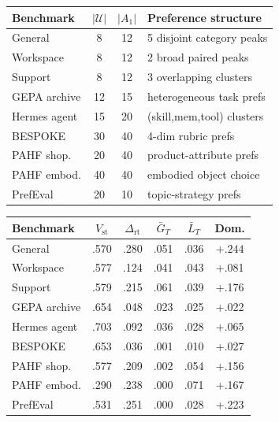 \documentclass{article} %
\begin{document}
\begin{table}[t]
\centering
\small
\begin{minipage}{0.48\textwidth}
\centering
\begin{tabular}{lccl}
\toprule
\textbf{Benchmark} & $|\mathcal{U}|$ & $|A_1|$ & Preference structure \\
\midrule
General       &  8 & 12 & 5 disjoint category peaks \\
Workspace     &  8 & 12 & 2 broad paired peaks \\
Support       &  8 & 12 & 3 overlapping clusters \\
GEPA archive  & 12 & 15 & heterogeneous task prefs \\
Hermes agent  & 15 & 20 & (skill,mem,tool) clusters \\
BESPOKE       & 30 & 40 & 4-dim rubric prefs \\
PAHF shop.    & 20 & 40 & product-attribute prefs \\
PAHF embod.   & 40 & 40 & embodied object choice \\
PrefEval      & 20 & 10 & topic-strategy prefs \\
\bottomrule
\end{tabular}
\label{tab:envs}
\end{minipage}
\hfill
\begin{minipage}{0.50\textwidth}
\centering
\begin{tabular}{lccccc}
\toprule
\textbf{Benchmark} & $V_{\mathrm{st}}$ & $\Delta_{\mathrm{rt}}$ & $\bar G_T$ & $\bar L_T$ & \textbf{Dom.} \\
\midrule
General       & .570 & .280 & .051 & .036 & $\mathbf{+.244}$ \\
Workspace     & .577 & .124 & .041 & .043 & +.081 \\
Support       & .579 & .215 & .061 & .039 & +.176 \\
GEPA archive  & .654 & .048 & .023 & .025 & +.022 \\
Hermes agent  & .703 & .092 & .036 & .028 & +.065 \\
BESPOKE       & .653 & .036 & .001 & .010 & +.027 \\
PAHF shop.    & .577 & .209 & .002 & .054 & +.156 \\
PAHF embod.   & .290 & .238 & .000 & .071 & +.167 \\
PrefEval      & .531 & .251 & .000 & .028 & +.223 \\
\bottomrule
\end{tabular}
\label{tab:main}\label{tab:e6-decomp}
\end{minipage}
\end{table}
\end{document}
